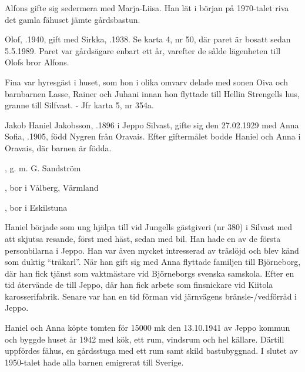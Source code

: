 Alfons gifte sig sedermera med Marja-Liisa. Han lät i början på 1970-talet riva det gamla fähuset jämte gårdsbastun.


Olof, .1940, gift med Sirkka, .1938. Se karta 4, nr 50, där paret är bosatt sedan 5.5.1989. Paret var gårdsägare enbart ett år, varefter de sålde lägenheten till Olofs bror Alfons.


Fina var hyresgäst i huset, som hon i olika omvarv delade med sonen Oiva och barnbarnen Lasse, Rainer och Juhani innan hon flyttade till Hellin Strengells hus, granne till Silfvast. - Jfr karta 5, nr 354a.


Jakob Haniel Jakobsson, .1896 i Jeppo Silvast, gifte sig den 27.02.1929 med Anna Sofia, .1905, född Nygren från Oravais. Efter giftermålet bodde Haniel och Anna i Oravais, där barnen är födda.
\begin{jhchildren}
  \item {}, g. m. G. Sandström
  \item {}
  \item {}, bor i Vålberg, Värmland
  \item {}, bor i Eskilstuna
\end{jhchildren}
Haniel började som ung hjälpa till vid Jungells gästgiveri (nr 380) i Silvast med att skjutsa resande, först med häst, sedan med bil. Han hade en av de första personbilarna i Jeppo. Han var även mycket intresserad av träslöjd och blev känd som duktig ``träkarl''. När han gift sig med Anna flyttade familjen till Björneborg, där han fick tjänst som vaktmästare vid Björneborgs svenska samskola. Efter en tid återvände de till Jeppo, där han fick arbete som finsnickare vid Kiitola karosserifabrik. Senare var han en tid förman vid järnvägens bränsle-/vedförråd i Jeppo.

Haniel och Anna köpte tomten för 15000 mk den 13.10.1941 av Jeppo kommun och byggde huset år 1942 med kök, ett rum, vindsrum och hel källare. Därtill uppfördes fähus, en gårdsstuga med ett rum samt skild bastubyggnad. I slutet av 1950-talet hade alla barnen emigrerat till Sverige.

